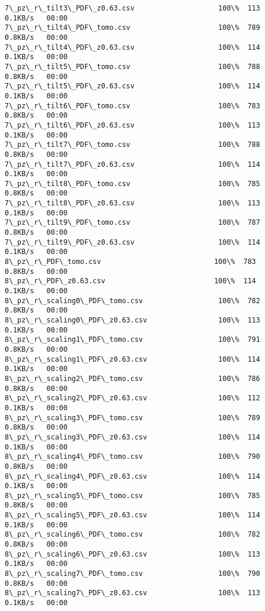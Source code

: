 \documentclass[11pt]{article}
\begin{document}
\begin{Verbatim}[commandchars=\\\{\}]
7\_pz\_r\_tilt3\_PDF\_z0.63.csv                    100\%  113     0.1KB/s   00:00    
7\_pz\_r\_tilt4\_PDF\_tomo.csv                     100\%  789     0.8KB/s   00:00    
7\_pz\_r\_tilt4\_PDF\_z0.63.csv                    100\%  114     0.1KB/s   00:00    
7\_pz\_r\_tilt5\_PDF\_tomo.csv                     100\%  788     0.8KB/s   00:00    
7\_pz\_r\_tilt5\_PDF\_z0.63.csv                    100\%  114     0.1KB/s   00:00    
7\_pz\_r\_tilt6\_PDF\_tomo.csv                     100\%  783     0.8KB/s   00:00    
7\_pz\_r\_tilt6\_PDF\_z0.63.csv                    100\%  113     0.1KB/s   00:00    
7\_pz\_r\_tilt7\_PDF\_tomo.csv                     100\%  788     0.8KB/s   00:00    
7\_pz\_r\_tilt7\_PDF\_z0.63.csv                    100\%  114     0.1KB/s   00:00    
7\_pz\_r\_tilt8\_PDF\_tomo.csv                     100\%  785     0.8KB/s   00:00    
7\_pz\_r\_tilt8\_PDF\_z0.63.csv                    100\%  113     0.1KB/s   00:00    
7\_pz\_r\_tilt9\_PDF\_tomo.csv                     100\%  787     0.8KB/s   00:00    
7\_pz\_r\_tilt9\_PDF\_z0.63.csv                    100\%  114     0.1KB/s   00:00    
8\_pz\_r\_PDF\_tomo.csv                           100\%  783     0.8KB/s   00:00    
8\_pz\_r\_PDF\_z0.63.csv                          100\%  114     0.1KB/s   00:00    
8\_pz\_r\_scaling0\_PDF\_tomo.csv                  100\%  782     0.8KB/s   00:00    
8\_pz\_r\_scaling0\_PDF\_z0.63.csv                 100\%  113     0.1KB/s   00:00    
8\_pz\_r\_scaling1\_PDF\_tomo.csv                  100\%  791     0.8KB/s   00:00    
8\_pz\_r\_scaling1\_PDF\_z0.63.csv                 100\%  114     0.1KB/s   00:00    
8\_pz\_r\_scaling2\_PDF\_tomo.csv                  100\%  786     0.8KB/s   00:00    
8\_pz\_r\_scaling2\_PDF\_z0.63.csv                 100\%  112     0.1KB/s   00:00    
8\_pz\_r\_scaling3\_PDF\_tomo.csv                  100\%  789     0.8KB/s   00:00    
8\_pz\_r\_scaling3\_PDF\_z0.63.csv                 100\%  114     0.1KB/s   00:00    
8\_pz\_r\_scaling4\_PDF\_tomo.csv                  100\%  790     0.8KB/s   00:00    
8\_pz\_r\_scaling4\_PDF\_z0.63.csv                 100\%  114     0.1KB/s   00:00    
8\_pz\_r\_scaling5\_PDF\_tomo.csv                  100\%  785     0.8KB/s   00:00    
8\_pz\_r\_scaling5\_PDF\_z0.63.csv                 100\%  114     0.1KB/s   00:00    
8\_pz\_r\_scaling6\_PDF\_tomo.csv                  100\%  782     0.8KB/s   00:00    
8\_pz\_r\_scaling6\_PDF\_z0.63.csv                 100\%  113     0.1KB/s   00:00    
8\_pz\_r\_scaling7\_PDF\_tomo.csv                  100\%  790     0.8KB/s   00:00    
8\_pz\_r\_scaling7\_PDF\_z0.63.csv                 100\%  113     0.1KB/s   00:00    

\end{Verbatim}
\end{document}
